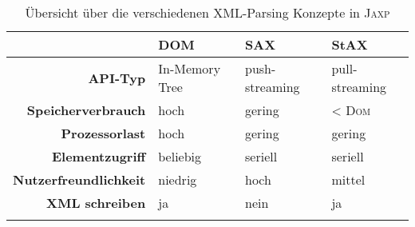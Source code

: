 \begin{table}[hb]
    \begin{longtable}[c]{r l l l}
        \toprule
        \rowcolor{lightgray}
        & \textbf{DOM}   & \textbf{SAX}   & \textbf{StAX} \\
        \midrule
        \textbf{API-Typ}                    & In-Memory Tree    & push-streaming    & pull-streaming\\
        \textbf{Speicherverbrauch}          & hoch              & gering            & \textless{} \textsc{Dom}\\
        \textbf{Prozessorlast}              & hoch              & gering            & gering \\
        \textbf{Elementzugriff}             & beliebig          & seriell           & seriell \\
        \textbf{Nutzerfreundlichkeit}       & niedrig           & hoch              & mittel \\
        \textbf{XML schreiben}              & ja                & nein              & ja \\
        \bottomrule
        \caption{Übersicht über die verschiedenen \gls{XML}-Parsing Konzepte in \textsc{Jaxp}}
        \label{tab:xmlParsingModels}
    \end{longtable}
\end{table}
